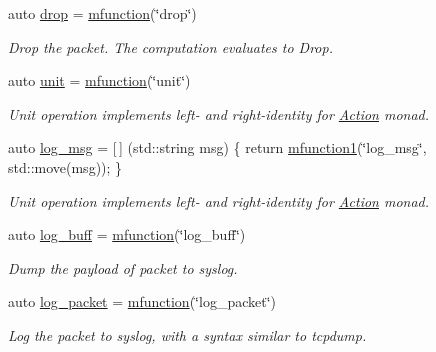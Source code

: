 \begin{DoxyCompactItemize}
auto \hyperlink{namespacepfq_1_1lang_1_1anonymous__namespace_02default_8hpp_03_a0d715988e000ac6284a1615091eb4067}{drop} = \hyperlink{namespacepfq_1_1lang_ac3ec84f09576bf5fb5db464623a4c165}{mfunction}(\char`\"{}drop\char`\"{})
\begin{DoxyCompactList}\small\item\em Drop the packet. The computation evaluates to {\ttfamily Drop}. \end{DoxyCompactList}\item 
auto \hyperlink{namespacepfq_1_1lang_1_1anonymous__namespace_02default_8hpp_03_a85f9b2d401cbb1d135679160de0e97de}{unit} = \hyperlink{namespacepfq_1_1lang_ac3ec84f09576bf5fb5db464623a4c165}{mfunction}(\char`\"{}unit\char`\"{})
\begin{DoxyCompactList}\small\item\em Unit operation implements left-\/ and right-\/identity for \hyperlink{structpfq_1_1lang_1_1Action}{Action} monad. \end{DoxyCompactList}\item 
auto \hyperlink{namespacepfq_1_1lang_1_1anonymous__namespace_02default_8hpp_03_a82e76226844f043aac9a2dd01615c9bb}{log\+\_\+msg} = \mbox{[}$\,$\mbox{]} (std\+::string msg) \{ return \hyperlink{namespacepfq_1_1lang_a68d775c68562fbd0ab9ef213f2519499}{mfunction1}(\char`\"{}log\+\_\+msg\char`\"{}, std\+::move(msg)); \}
\begin{DoxyCompactList}\small\item\em Unit operation implements left-\/ and right-\/identity for \hyperlink{structpfq_1_1lang_1_1Action}{Action} monad. \end{DoxyCompactList}\item 
auto \hyperlink{namespacepfq_1_1lang_1_1anonymous__namespace_02default_8hpp_03_ac16d4c4b496e6e882901d84ded462101}{log\+\_\+buff} = \hyperlink{namespacepfq_1_1lang_ac3ec84f09576bf5fb5db464623a4c165}{mfunction}(\char`\"{}log\+\_\+buff\char`\"{})
\begin{DoxyCompactList}\small\item\em Dump the payload of packet to syslog. \end{DoxyCompactList}\item 
auto \hyperlink{namespacepfq_1_1lang_1_1anonymous__namespace_02default_8hpp_03_aed6076a98aece625738cbda3689183e2}{log\+\_\+packet} = \hyperlink{namespacepfq_1_1lang_ac3ec84f09576bf5fb5db464623a4c165}{mfunction}(\char`\"{}log\+\_\+packet\char`\"{})
\begin{DoxyCompactList}\small\item\em Log the packet to syslog, with a syntax similar to tcpdump. \end{DoxyCompactList}\item 

\end{DoxyCompactItemize}
